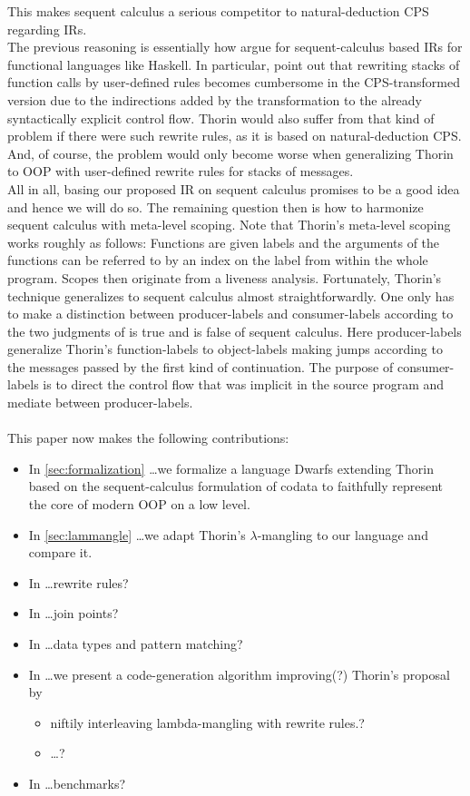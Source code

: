 This makes sequent calculus a serious competitor to natural-deduction CPS regarding IRs.
\\
The previous reasoning is essentially how \citet{downen2016sequent} argue for sequent-calculus based IRs for functional languages like Haskell.
In particular, \citet{downen2016sequent} point out that rewriting stacks of function calls by user-defined rules becomes cumbersome in the CPS-transformed version due to the indirections added by the transformation to the already syntactically explicit control flow.
Thorin would also suffer from that kind of problem if there were such rewrite rules, as it is based on natural-deduction CPS.
And, of course, the problem would only become worse when generalizing Thorin to OOP with user-defined rewrite rules for stacks of messages.
\\
All in all, basing our proposed IR on sequent calculus promises to be a good idea and hence we will do so.
The remaining question then is how to harmonize sequent calculus with meta-level scoping.
Note that Thorin's meta-level scoping works roughly as follows:
Functions are given labels and the arguments of the functions can be referred to by an index on the label from within the whole program.
Scopes then originate from a liveness analysis.
Fortunately, Thorin's technique generalizes to sequent calculus almost straightforwardly.
One only has to make a distinction between producer-labels and consumer-labels according to the two judgments of {\glqq}is true{\grqq} and {\glqq}is false{\grqq} of sequent calculus.
Here producer-labels generalize Thorin's function-labels to object-labels making jumps according to the messages passed by the first kind of continuation.
The purpose of consumer-labels is to direct the control flow that was implicit in the source program and mediate between producer-labels.
\\\\
This paper now makes the following contributions:
\begin{itemize}
  \item
    In \cref{sec:formalization} \ldots we formalize a language Dwarfs extending Thorin based on the sequent-calculus formulation of codata to faithfully represent the core of modern OOP on a low level.
  \item
    In \cref{sec:lammangle} \ldots we adapt Thorin's $\lambda$-mangling to our language and compare it.
  \item
    In \ldots rewrite rules?
  \item
    In \ldots join points?
  \item
    In \ldots data types and pattern matching?
  \item
    In \ldots we present a code-generation algorithm improving(?) Thorin's proposal by
    \begin{itemize}
      \item
        niftily interleaving lambda-mangling with rewrite rules.?
      \item
        \ldots?
    \end{itemize}
  \item
    In \ldots benchmarks?
\end{itemize}
